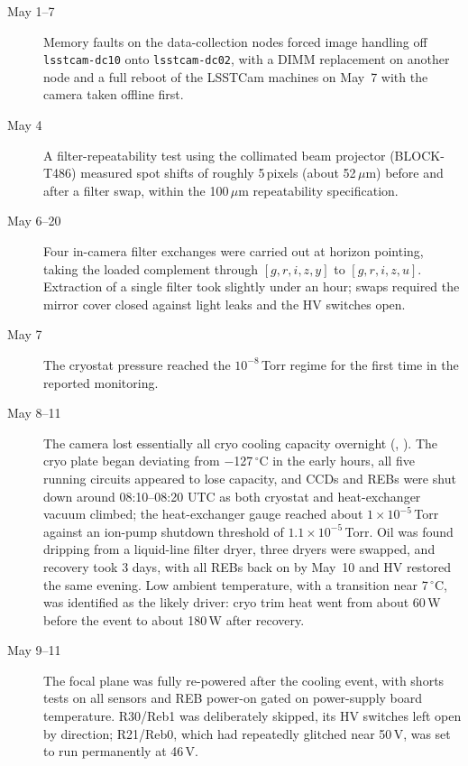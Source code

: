 \begin{description}
\item[May 1--7] Memory faults on the data-collection nodes forced
  image handling off \texttt{lsstcam-dc10} onto \texttt{lsstcam-dc02},
  with a DIMM replacement on another node and a full reboot of the
  LSSTCam machines on May~7 with the camera taken offline first.

\item[May 4] A filter-repeatability test using the collimated beam
  projector (BLOCK-T486) measured spot shifts of roughly 5\,pixels
  (about 52\,$\mu$m) before and after a filter swap, within the
  100\,$\mu$m repeatability specification.

\item[May 6--20] Four in-camera filter exchanges were carried out at
  horizon pointing, taking the loaded complement through
  $[g,r,i,z,y]$ to $[g,r,i,z,u]$.  Extraction of a single filter took
  slightly under an hour; swaps required the mirror cover closed
  against light leaks and the HV switches open.

\item[May 7] The cryostat pressure reached the $10^{-8}$\,Torr regime
  for the first time in the reported monitoring.

\item[May 8--11] The camera lost essentially all cryo cooling capacity
  overnight (, ).  The cryo plate began deviating
  from $-$127\,$^{\circ}$C in the early hours, all five running circuits
  appeared to lose capacity, and CCDs and REBs were shut down around
  08:10--08:20 UTC as both cryostat and heat-exchanger vacuum climbed; the
  heat-exchanger gauge reached about $1\times10^{-5}$\,Torr against an
  ion-pump shutdown threshold of $1.1\times10^{-5}$\,Torr.  Oil was
  found dripping from a liquid-line filter dryer, three dryers were
  swapped, and recovery took 3 days, with all REBs back on by
  May~10 and HV restored the same evening.  Low ambient temperature,
  with a transition near 7\,$^{\circ}$C, was identified as the likely
  driver: cryo trim heat went from about 60\,W before the event to
  about 180\,W after recovery.

\item[May 9--11] The focal plane was fully re-powered after the
  cooling event, with shorts tests on all sensors and REB power-on
  gated on power-supply board temperature.  R30/Reb1 was deliberately
  skipped, its HV switches left open by direction; R21/Reb0, which had
  repeatedly glitched near 50\,V, was set to run permanently at
  46\,V.


\end{description}
